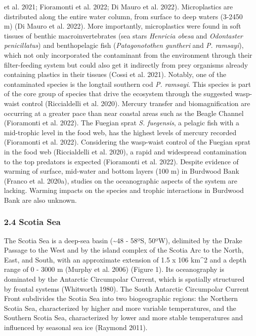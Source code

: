 \documentclass[
]{article}
\begin{document}
et al. 2021; Fioramonti et al. 2022; Di Mauro et al. 2022).
Microplastics are distributed along the entire water column, from
surface to deep waters (3-2450 m) (Di Mauro et al. 2022). More
importantly, microplastics were found in soft tissues of benthic
macroinvertebrates (sea stars \emph{Henricia obesa} and \emph{Odontaster
penicillatus}) and benthopelagic fish (\emph{Patagonotothen guntheri}
and \emph{P. ramsayi}), which not only incorporated the contaminant from
the environment through their filter-feeding system but could also get
it indirectly from prey organisms already containing plastics in their
tissues (Cossi et al. 2021). Notably, one of the contaminated species is
the longtail southern cod \emph{P. ramsayi}. This species is part of the
core group of species that drive the ecosystem through the suggested
wasp-waist control (Riccialdelli et al. 2020). Mercury transfer and
biomagnification are occurring at a greater pace than near coastal areas
such as the Beagle Channel (Fioramonti et al. 2022). The Fuegian sprat
\emph{S. fuegensis}, a pelagic fish with a mid-trophic level in the food
web, has the highest levels of mercury recorded (Fioramonti et al.
2022). Considering the wasp-waist control of the Fuegian sprat in the
food web (Riccialdelli et al. 2020), a rapid and widespread
contamination to the top predators is expected (Fioramonti et al. 2022).
Despite evidence of warming of surface, mid-water and bottom layers (100
m) in Burdwood Bank (Franco et al. 2020a), studies on the oceanographic
aspects of the system are lacking. Warming impacts on the species and
trophic interactions in Burdwood Bank are also unknown.

\subsubsection{2.4 Scotia Sea}\label{scotia-sea}

The Scotia Sea is a deep-sea basin (\textasciitilde48 - 58ºS, 50ºW),
delimited by the Drake Passage to the West and by the island complex of
the Scotia Arc to the North, East, and South, with an approximate
extension of 1.5 x 106 km\^{}2 and a depth range of 0 - 3000 m (Murphy
et al. 2006) (Figure 1). Its oceanography is dominated by the Antarctic
Circumpolar Current, which is spatially structured by frontal systems
(Whitworth 1980). The South Antarctic Circumpolar Current Front
subdivides the Scotia Sea into two biogeographic regions: the Northern
Scotia Sea, characterized by higher and more variable temperatures, and
the Southern Scotia Sea, characterized by lower and more stable
temperatures and influenced by seasonal sea ice (Raymond 2011).
\end{document}
